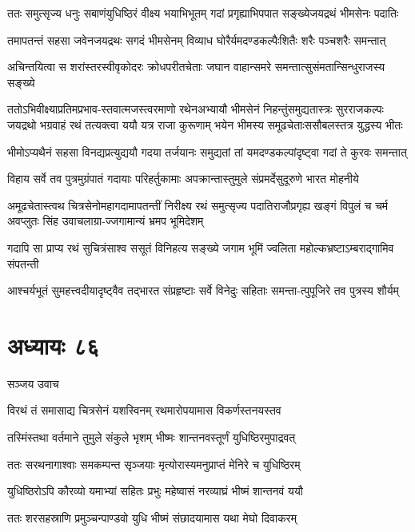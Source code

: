 \twolineshloka
{ततः समुत्सृज्य धनुः सबाणंयुधिष्ठिरं वीक्ष्य भयाभिभूतम्}
{गदां प्रगृह्याभिपपात सङ्ख्येजयद्रथं भीमसेनः पदातिः}


\twolineshloka
{तमापतन्तं सहसा जवेनजयद्रथः सगदं भीमसेनम्}
{विव्याध घोरैर्यमदण्डकल्पैःशितैः शरैः पञ्चशरैः समन्तात्}


\twolineshloka
{अचिन्तयित्वा स शरांस्तरस्वीवृकोदरः क्रोधपरीतचेताः}
{जघान वाहान्समरे समन्तात्सुसंमतान्सिन्धुराजस्य सङ्ख्ये}


ततोऽभिवीक्ष्याप्रतिमप्रभाव-स्तवात्मजस्त्वरमाणो रथेनअभ्यायौ भीमसेनं निहन्तुंसमुद्यतास्त्रः सुरराजकल्पः
\twolineshloka
{जयद्रथो भग्रवाहं रथं तत्यक्त्वा ययौ यत्र राजा कुरूणाम्}
{भयेन भीमस्य समूढचेताःससौबलस्तत्र युद्धस्य भीतः}


\twolineshloka
{भीमोऽप्यथैनं सहसा विनद्यप्रत्युद्ययौ गदया तर्जयानः}
{समुद्यतां तां यमदण्डकल्पांदृष्ट्वा गदां ते कुरवः समन्तात्}


\twolineshloka
{विहाय सर्वे तव पुत्रमुग्रंपातं गदायाः परिहर्तुकामाः}
{अपक्रान्तास्तुमुले संप्रमर्देसुदूरुणे भारत मोहनीये}


\threelineshloka
{अमूढचेतास्त्वथ चित्रसेनोमहागदामापतन्तीं निरीक्ष्य}
{रथं समुत्सृज्य पदातिराजौप्रगृह्य खङ्गं विपुलं च चर्म}
{अवप्लुतः सिंह उवाचलाग्रा-ज्जगामान्यं भ्रमप भूमिदेशम्}


\twolineshloka
{गदापि सा प्राप्य रथं सुचित्रंसाश्व ससूतं विनिहत्य सङ्ख्ये}
{जगाम भूमिं ज्वलिता महोल्कभ्रष्टाऽम्बराद्गामिव संपतन्ती}


\twolineshloka
{आश्चर्यभूतं सुमहत्त्वदीयादृष्ट्वैव तद्भारत संप्रहृष्टाः}
{सर्वे विनेदुः सहिताः समन्ता-त्पुपूजिरे तव पुत्रस्य शौर्यम्}


\chapter{अध्यायः ८६}
\twolineshloka
{सञ्जय उवाच}
{}


\twolineshloka
{विरथं तं समासाद्य चित्रसेनं यशस्विनम्}
{रथमारोपयामास विकर्णस्तनयस्तव}


\twolineshloka
{तस्मिंस्तथा वर्तमाने तुमुले संकुले भृशम्}
{भीष्मः शान्तनवस्तूर्णं युधिष्ठिरमुपाद्रवत्}


\twolineshloka
{ततः सरथनागाश्वाः समकम्पन्त सृञ्जयाः}
{मृत्योरास्यमनुप्राप्तं मेनिरे च युधिष्ठिरम्}


\twolineshloka
{युधिष्ठिरोऽपि कौरव्यो यमाभ्यां सहितः प्रभुः}
{महेष्वासं नरव्याघ्रं भीष्मं शान्तनवं ययौ}


\twolineshloka
{ततः शरसहस्राणि प्रमुञ्चन्पाण्डवो युधि}
{भीष्मं संछादयामास यथा मेघो दिवाकरम्}


